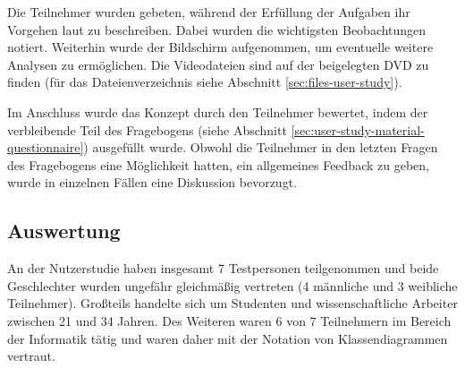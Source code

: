 Die Teilnehmer wurden gebeten, während der Erfüllung der Aufgaben ihr Vorgehen laut zu beschreiben. Dabei wurden die wichtigsten Beobachtungen notiert. Weiterhin wurde der Bildschirm aufgenommen, um eventuelle weitere Analysen zu ermöglichen. Die Videodateien sind auf der beigelegten DVD zu finden (für das Dateienverzeichnis siehe Abschnitt \ref{sec:files-user-study}).

Im Anschluss wurde das Konzept durch den Teilnehmer bewertet, indem der verbleibende Teil des Fragebogens (siehe Abschnitt \ref{sec:user-study-material-questionnaire}) ausgefüllt wurde. Obwohl die Teilnehmer in den letzten Fragen des Fragebogens eine Möglichkeit hatten, ein allgemeines Feedback zu geben, wurde in einzelnen Fällen eine Diskussion bevorzugt.

\subsection{Auswertung}
\label{subsec:user-study-evaluation}

An der Nutzerstudie haben insgesamt 7 Testpersonen teilgenommen und beide Geschlechter wurden ungefähr gleichmäßig vertreten (4 männliche und 3 weibliche Teilnehmer). Großteils handelte sich um Studenten und wissenschaftliche Arbeiter zwischen 21 und 34 Jahren. Des Weiteren waren 6 von 7 Teilnehmern im Bereich der Informatik tätig und waren daher mit der Notation von Klassendiagrammen vertraut.

